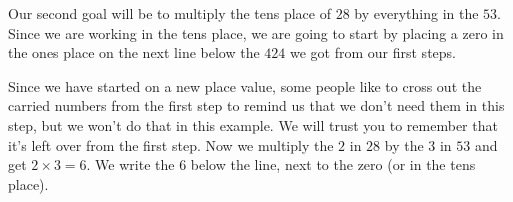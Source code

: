 \documentclass{ximera}
\begin{document}
Our second goal will be to multiply the tens place of $28$ by everything in the $53$. Since we are working in the tens place, we are going to start by placing a zero in the ones place on the next line below the $424$ we got from our first steps. 
\begin{center}
\end{center}

Since we have started on a new place value, some people like to cross out the carried numbers from the first step to remind us that we don't need them in this step, but we won't do that in this example. We will trust you to remember that it's left over from the first step. Now we multiply the $2$ in $28$ by the $3$ in $53$ and get $2 \times 3 = 6$. We write the $6$ below the line, next to the zero (or in the tens place).

\begin{center}
\end{center}
\end{document}
